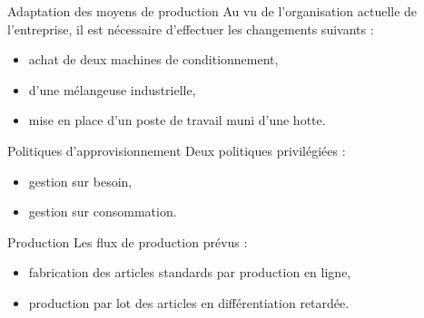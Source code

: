 
\begin{frame}{Adaptation des moyens de production}
	Au vu de l'organisation actuelle de l'entreprise,
	il est nécessaire d'effectuer les changements suivants :
	
	\begin{itemize}
		\item<1-> achat de deux machines de conditionnement,
		\item<2-> d'une mélangeuse industrielle,
		\item<3-> mise en place d'un poste de travail muni d'une hotte.
	\end{itemize}
	
\end{frame}

\begin{frame}{Politiques d'approvisionnement}
	Deux politiques privilégiées :
	\begin{itemize}
		\item<1-> gestion sur besoin,
		\item<2-> gestion sur consommation.
	\end{itemize}
\end{frame}

\begin{frame}{Production}
	Les flux de production prévus :
	\begin{itemize}
	\item<1-> fabrication des articles standards par production en ligne,
	\item<2-> production par lot des articles en différentiation retardée.
	\end{itemize}
\end{frame}


